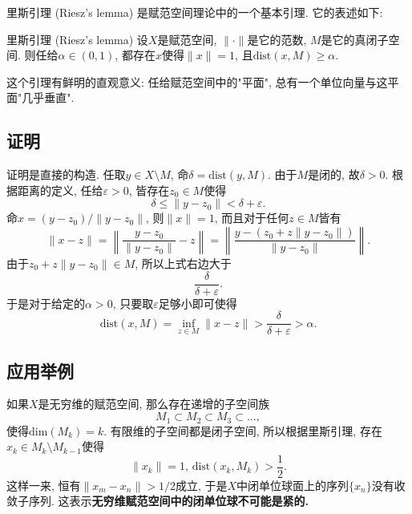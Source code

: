 
里斯引理 (Riesz's lemma) 是赋范空间理论中的一个基本引理. 它的表述如下:

\begin{lemma}{里斯引理 (Riesz's lemma)}
设$X$是赋范空间, $\|\cdot\|$是它的范数, $M$是它的真闭子空间. 则任给$\alpha\in(0,1)$, 都存在$x$使得$\|x\|=1$, 且$\text{dist}(x,M)\geq\alpha$.
\end{lemma}

这个引理有鲜明的直观意义: 任给赋范空间中的"平面", 总有一个单位向量与这平面"几乎垂直".

\subsection{证明}
证明是直接的构造. 任取$y\in X\setminus M$, 命$\delta=\text{dist}(y,M)$. 由于$M$是闭的, 故$\delta>0$. 根据距离的定义, 任给$\varepsilon>0$, 皆存在$z_0\in M$使得
$$
\delta\leq \|y-z_0\|<\delta+\varepsilon.
$$
命$x=(y-z_0)/\|y-z_0\|$, 则$\|x\|=1$, 而且对于任何$z\in M$皆有
$$
\|x-z\|
=\left\|\frac{y-z_0}{\|y-z_0\|}-z\right\|
=\left\|\frac{y-(z_0+z\|y-z_0\|)}{\|y-z_0\|}\right\|.
$$
由于$z_0+z\|y-z_0\|\in M$, 所以上式右边大于
$$
\frac{\delta}{\delta+\varepsilon}.
$$
于是对于给定的$\alpha>0$, 只要取$\varepsilon$足够小即可使得
$$
\text{dist}(x,M)
=\inf_{z\in M}\|x-z\|
>\frac{\delta}{\delta+\varepsilon}
>\alpha.
$$

\subsection{应用举例}
如果$X$是无穷维的赋范空间, 那么存在递增的子空间族
$$
M_1\subset M_2\subset M_3\subset...,
$$
使得$\text{dim}(M_k)=k$. 有限维的子空间都是闭子空间, 所以根据里斯引理, 存在$x_k\in M_k\setminus M_{k-1}$使得
$$
\|x_k\|=1,\,\text{dist}(x_k,M_k)>\frac{1}{2}.
$$
这样一来, 恒有$\|x_m-x_n\|>1/2$成立, 于是$X$中闭单位球面上的序列$\{x_n\}$没有收敛子序列. 这表示\textbf{无穷维赋范空间中的闭单位球不可能是紧的.}